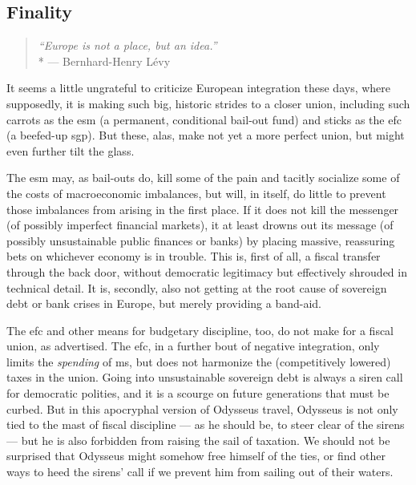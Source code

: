 \subsection[Finality]{Finality}

\begin{quote}
	\emph{``Europe is not a place, but an idea.''}
	\\*
	--- Bernhard-Henry L\'{e}vy
\end{quote}

It seems a little ungrateful to criticize European integration these days, where supposedly, it is making such big, historic strides to a closer union, including such carrots as the \gls{esm} (a permanent, conditional bail-out fund) and sticks as the \gls{efc} (a beefed-up \gls{sgp}).
But these, alas, make not yet a more perfect union, but might even further tilt the glass.

The \gls{esm} may, as bail-outs do, kill some of the pain and tacitly socialize some of the costs of macroeconomic imbalances, but will, in itself, do little to prevent those imbalances from arising in the first place.
If it does not kill the messenger (of possibly imperfect financial markets), it at least drowns out its message (of possibly unsustainable public finances or banks) by placing massive, reassuring bets on whichever economy is in trouble.
This is, first of all, a fiscal transfer through the back door, without democratic legitimacy but effectively  shrouded in technical detail.
It is, secondly, also not getting at the root cause of sovereign debt or bank crises in Europe, but merely providing a band-aid.

The \gls{efc} and other means for budgetary discipline, too, do not make for a fiscal union, as advertised.
The \gls{efc}, in a further bout of negative integration, only limits the \emph{spending} of \gls{ms}, but does not harmonize the (competitively lowered) taxes in the union.
Going into unsustainable sovereign debt is always a siren call for democratic polities, and it is a scourge on future generations that must be curbed.
But in this apocryphal version of Odysseus travel, Odysseus is not only tied to the mast of fiscal discipline --- as he should be, to steer clear of the sirens --- but he is also forbidden from raising the sail of taxation.
We should not be surprised that Odysseus might somehow free himself of the ties, or find other ways to heed the sirens' call if we prevent him from sailing out of their waters.

